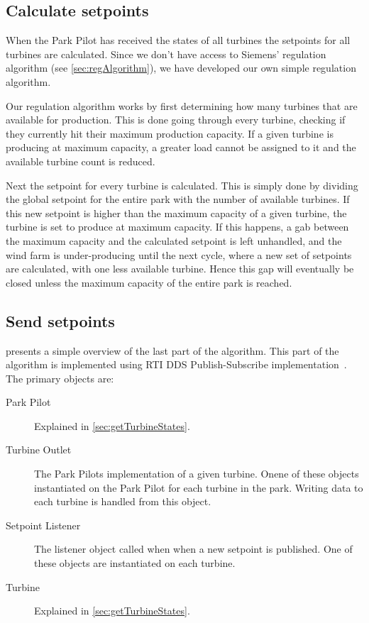 \subsection{Calculate setpoints}\label{sec:calculateSetpoints}

When the Park Pilot has received the states of all turbines the setpoints for all turbines are calculated. Since we don't have access to Siemens' regulation algorithm (see \cref{sec:regAlgorithm}), we have developed our own simple regulation algorithm.

Our regulation algorithm works by first determining how many turbines that are available for production. This is done going through every turbine, checking if they currently hit their maximum production capacity. If a given turbine is producing at maximum capacity, a greater load cannot be assigned to it and the available turbine count is reduced. 

Next the setpoint for every turbine is calculated. This is simply done by dividing the global setpoint for the entire park with the number of available turbines. If this new setpoint is higher than the maximum capacity of a given turbine, the turbine is set to produce at maximum capacity. If this happens, a gab between the maximum capacity and the calculated setpoint is left unhandled, and the wind farm is under-producing until the next cycle, where a new set of setpoints are calculated, with one less available turbine. Hence this gap will eventually be closed unless the maximum capacity of the entire park is reached.

\subsection{Send setpoints}

 presents a simple overview of the last part of the algorithm. This part of the algorithm is implemented using RTI DDS Publish-Subscribe implementation~\cite{rtiConnextUsersManual}. The primary objects are:

\begin{description}
	\item [Park Pilot] Explained in \cref{sec:getTurbineStates}.
	\item [Turbine Outlet] The Park Pilots implementation of a given turbine. Onene of these objects instantiated on the Park Pilot for each turbine in the park. Writing data to each turbine is handled from this object.
	\item [Setpoint Listener] The listener object called when when a new setpoint is published. One of these objects are instantiated on each turbine.
	\item [Turbine] Explained in \cref{sec:getTurbineStates}.
\end{description}

